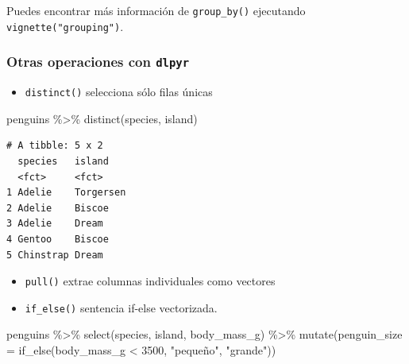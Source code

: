 \documentclass[
  letterpaper,
  DIV=11,
  numbers=noendperiod]{scrreprt}
\newenvironment{Shaded}{\begin{snugshade}}{\end{snugshade}}
\newcommand{\AttributeTok}[1]{\textcolor[rgb]{0.40,0.45,0.13}{#1}}
\newcommand{\CommentTok}[1]{\textcolor[rgb]{0.37,0.37,0.37}{#1}}
\newcommand{\DecValTok}[1]{\textcolor[rgb]{0.68,0.00,0.00}{#1}}
\newcommand{\FunctionTok}[1]{\textcolor[rgb]{0.28,0.35,0.67}{#1}}
\newcommand{\NormalTok}[1]{\textcolor[rgb]{0.00,0.23,0.31}{#1}}
\newcommand{\SpecialCharTok}[1]{\textcolor[rgb]{0.37,0.37,0.37}{#1}}
\newcommand{\StringTok}[1]{\textcolor[rgb]{0.13,0.47,0.30}{#1}}
\providecommand{\tightlist}{%
  \setlength{\itemsep}{0pt}\setlength{\parskip}{0pt}}\usepackage{longtable,booktabs,array}
\begin{document}
Puedes encontrar más información de \texttt{group\_by()} ejecutando
\texttt{vignette("grouping")}.

\subsubsection{\texorpdfstring{\textbf{Otras operaciones con
\texttt{dlpyr}}}{Otras operaciones con dlpyr}}\label{otras-operaciones-con-dlpyr}

\begin{itemize}
\tightlist
\item
  \texttt{distinct()} selecciona sólo filas únicas
\end{itemize}

\begin{Shaded}
\begin{Highlighting}[]
\NormalTok{penguins }\SpecialCharTok{\%\textgreater{}\%} 
  \FunctionTok{distinct}\NormalTok{(species, island)}
\end{Highlighting}
\end{Shaded}

\begin{verbatim}
# A tibble: 5 x 2
  species   island   
  <fct>     <fct>    
1 Adelie    Torgersen
2 Adelie    Biscoe   
3 Adelie    Dream    
4 Gentoo    Biscoe   
5 Chinstrap Dream    
\end{verbatim}

\begin{itemize}
\tightlist
\item
  \texttt{pull()} extrae columnas individuales como vectores
\end{itemize}

\begin{Shaded}
\end{Shaded}

\begin{itemize}
\tightlist
\item
  \texttt{if\_else()} sentencia if-else vectorizada.
\end{itemize}

\begin{Shaded}
\begin{Highlighting}[]
\NormalTok{penguins }\SpecialCharTok{\%\textgreater{}\%} \FunctionTok{select}\NormalTok{(species, island, body\_mass\_g) }\SpecialCharTok{\%\textgreater{}\%} 
  \FunctionTok{mutate}\NormalTok{(}\AttributeTok{penguin\_size =} \FunctionTok{if\_else}\NormalTok{(body\_mass\_g }\SpecialCharTok{\textless{}} \DecValTok{3500}\NormalTok{,}
                                \StringTok{"pequeño"}\NormalTok{,}
                                \StringTok{"grande"}\NormalTok{))}
\end{Highlighting}
\end{Shaded}
\end{document}
